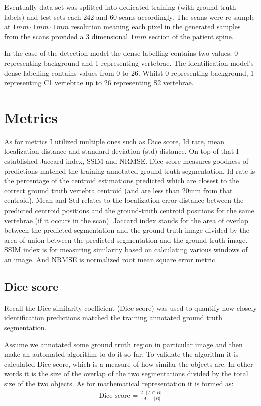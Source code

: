 Eventually data set was splitted into dedicated training (with ground-truth labels) and test sets each 242 and 60 scans accordingly. The scans were re-sample at $1mm \cdot 1mm \cdot 1mm$ resolution meaning each pixel in the generated samples from the scans provided a 3 dimensional $1mm$ section of the patient spine.

In the case of the detection model the dense labelling contains two values: 0 representing background and 1 representing vertebrae. The identification model’s dense labelling contains values from 0 to 26. Whilst 0 representing background, 1 representing C1 vertebrae up to 26 representing S2 vertebrae.



\newpage
\section{Metrics}
As for metrics I utilized multiple ones such as Dice score, Id rate, mean localization distance and standard deviation (std) distance. On top of that I established Jaccard index, SSIM and NRMSE. Dice score measures goodness of predictions matched the training annotated ground truth segmentation, Id rate is the percentage of the centroid estimations predicted which are closest to the correct ground truth vertebra centroid (and are less than 20mm from that centroid). Mean and Std relates to the localization error distance between the predicted centroid positions and the ground-truth centroid positions for the same vertebrae (if it occurs in the scan). Jaccard index stands for the area of overlap between the predicted segmentation and the ground truth image divided by the area of union between the predicted segmentation and the ground truth image. SSIM index is for measuring similarity based on calculating various windows of an image. And NRMSE is normalized root mean square error metric. 

\subsection{Dice score}
Recall the \cite{Thada2013} Dice similarity coefficient (Dice score) was used to quantify how closely identification predictions matched the training annotated ground truth segmentation. 

Assume we annotated some ground truth region in particular image and then make an automated algorithm to do it so far. To validate the algorithm it is calculated Dice score, which is a measure of how similar the objects are. In other words it is the size of the overlap of the two segmentations divided by the total size of the two objects. As for mathematical representation it is formed as:
\begin{align*}
  \text{Dice score} = \frac{2\cdot | A\cap B|}{|A| + |B|}
\end{align*}

